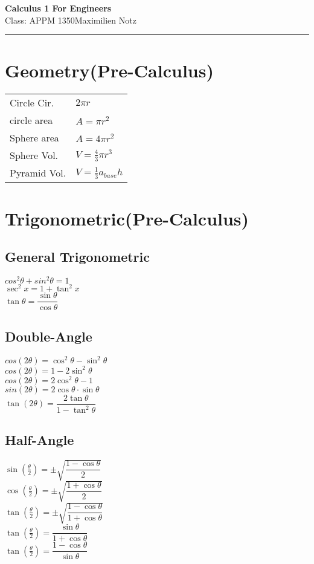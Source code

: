 \documentclass[5pt]{article}
\begin{document}
\begin{center}
     \Large{\textbf{Calculus 1 For Engineers}}\\
     \small{Class: APPM 1350}\hfill\small{\textcopyright Maximilien Notz \the\year{}}
     \noindent\rule{20.2cm}{0.4pt}
\end{center}


\begin{multicols}{3}
\setcounter{secnumdepth}{0}

\section{Geometry\footnotesize{(Pre-Calculus)}}
\begin{tabular}{ll}
Circle Cir. & $2\pi r$\\
circle area & $A=\pi r^2$\\
Sphere area & $A=4\pi r^2$\\
Sphere Vol. & $V =\frac{4}{3}\pi r^3$\\[1pt]
Pyramid Vol. & $V =\frac{1}{3}a_{base} h$\\

\end{tabular}

\section{Trigonometric\footnotesize{(Pre-Calculus)}}
\subsection{General Trigonometric}
$cos^2\theta + sin^2\theta=1$\\
$\sec^2{x}=1+\tan^2{x}$\\
$\tan{\theta}=\dfrac{\sin{\theta}}{\cos{\theta}}$

\subsection{Double-Angle}
$cos(2\theta)=\cos^2{\theta}-\sin^2{\theta}$\\
$cos(2\theta)=1-2\sin^2{\theta}$\\
$cos(2\theta)=2\cos^2{\theta}-1$\\
$sin(2\theta)=2\cos{\theta}\cdot\sin{\theta}$\\
$\tan(2\theta)=\dfrac{2\tan{\theta}}{1-\tan^2{\theta}}$

\subsection{Half-Angle}
$\sin(\frac{\theta}{2})=\pm\sqrt{\dfrac{1-\cos{\theta}}{2}}$\\
$\cos(\frac{\theta}{2})=\pm\sqrt{\dfrac{1+\cos{\theta}}{2}}$\\
$\tan(\frac{\theta}{2})=\pm\sqrt{\dfrac{1-\cos{\theta}}{1+\cos{\theta}}}$\\[3pt]
$\tan(\frac{\theta}{2})= \dfrac{\sin{\theta}}{1+\cos{\theta}}$\\
$\tan(\frac{\theta}{2})= \dfrac{1-\cos{\theta}}{\sin{\theta}}$


\end{multicols}
\end{document}
